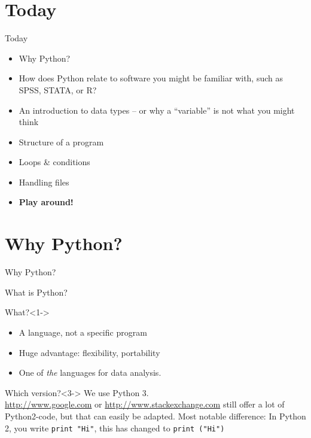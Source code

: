 \documentclass{beamer}
\begin{document}
%
%
%

\section{Today}
\begin{frame}{Today}
	\begin{itemize}
		\item Why Python?
		\item How does Python relate to software you might be familiar with, such as SPSS, STATA, or R?
	\item An introduction to data types – or why a “variable” is not what you might think
	\item Structure of a program
	\item Loops \& conditions
	\item Handling files
	\item \textbf{Play around!}
	\end{itemize}
	
\end{frame}





\section{Why Python?}
\begin{frame}[plain]
	Why Python?
\end{frame}


\begin{frame}{What is Python?}
	\begin{block}{What?}<1->
		\begin{itemize}
			\item A language, not a specific program
			\item Huge advantage: flexibility, portability
			\item One of \emph{the} languages for data analysis. %
		\end{itemize}
	\end{block}
	
	\begin{block}{Which version?}<3->
		We use Python 3. \\ 
		\footnotesize{\url{http://www.google.com} or \url{http://www.stackexchange.com} still offer a lot of Python2-code, but that can easily be adapted. Most notable difference: In Python 2, you write {\tt print "Hi"}, this has changed to {\tt print ("Hi")}}\\
	\end{block}
\end{frame}
\end{document}

